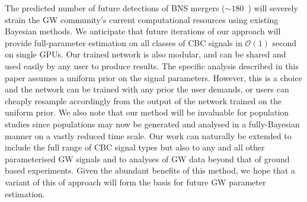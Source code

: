 \documentclass{article}
\begin{document}
%
%
The predicted number of future detections of \ac{BNS} mergers ($\sim
180$~\cite{2018LRR....21....3A}) will severely strain the \ac{GW} community's
current computational resources using existing Bayesian methods. We anticipate
that future iterations of our approach will provide full-parameter estimation
on all classes of \ac{CBC} signals in $\mathcal{O}(1)$ second on single
\acp{GPU}. Our trained network is also modular, and can be shared and used
easily by any user to produce results. The specific analysis described in this
paper assumes a uniform prior on the signal parameters. However, this is a
choice and the network can be trained with any prior the user demands, or users
can cheaply resample accordingly from the output of the network trained on the
uniform prior. We also note that our method will be invaluable for population
studies since populations may now be generated and analysed in a fully-Bayesian
manner on a vastly reduced time scale. Our work can naturally be extended to include the full range of \ac{CBC} signal types but also to any and all other parameterised \ac{GW}
signals and to analyses of \ac{GW} data beyond that of ground based
experiments. Given the abundant benefits of this method, we hope that a variant
of this of approach will form the basis for future \ac{GW} parameter
estimation.
 

%
%
\end{document}

